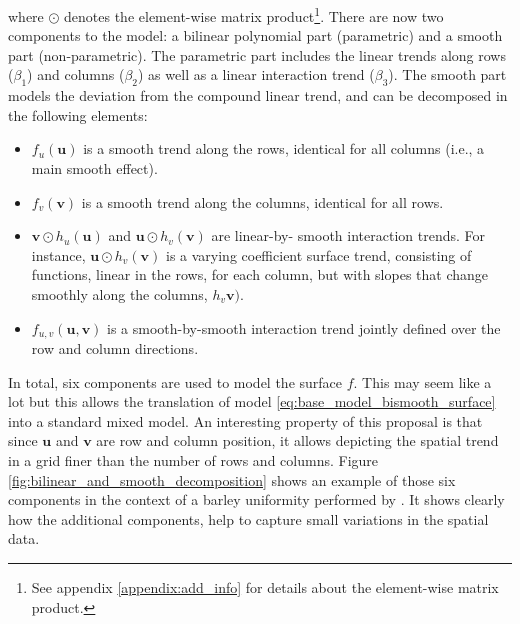 where $\odot$ denotes the element-wise matrix product\footnote{See appendix \ref{appendix:add_info} for details about the element-wise matrix product.}. There are now two components to the model: a bilinear polynomial part (parametric) and a smooth part (non-parametric). The parametric part includes the linear trends along rows ($\beta_1$) and columns ($\beta_2$) as well as a linear interaction trend ($\beta_3$). The smooth part models the deviation from the compound linear trend, and can be decomposed in the following elements:
	\begin{itemize}
		\item $f_{u}(\boldsymbol{u})$  is a smooth trend along the rows, identical for all columns (i.e., a main smooth effect).
		\item $f_{v}(\boldsymbol{v})$ is a smooth trend along the columns, identical for all rows.
		\item $\boldsymbol{v} \odot h_{u} (\boldsymbol{u})$ and $\boldsymbol{u} \odot h_{v} (\boldsymbol{v})$ are linear-by-
		smooth interaction trends. For instance, $\boldsymbol{u} \odot h_{v}(\boldsymbol{v})$ is a varying coefficient surface 
		trend, consisting of functions, linear in the rows, for each column, but with slopes that change smoothly along the 
		columns, $h_{v}\boldsymbol{v})$.
		\item $f_{u,v}(\boldsymbol{u},\boldsymbol{v})$ is a smooth-by-smooth interaction trend jointly defined over the row and 
		column directions.
	\end{itemize}
In total, six components are used to model the surface $f$. This may seem like a lot but this allows the translation of model \ref{eq:base_model_bismooth_surface} into a standard mixed model. An interesting property of this proposal is that since $\boldsymbol{u}$ and $\boldsymbol{v}$ are row and column position, it allows depicting the spatial trend in a grid finer than the number of rows and columns. Figure \ref{fig:bilinear_and_smooth_decomposition} shows an example of those six components in the context of a barley uniformity performed by \textcite{williams1988contemporary}. It shows clearly how the additional components, help to capture small variations in the spatial data.


